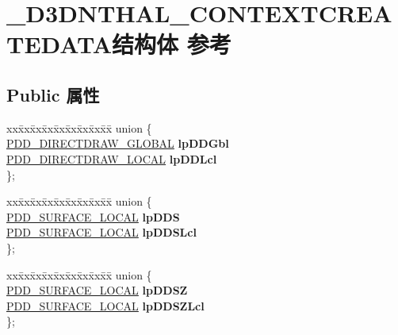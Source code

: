 \hypertarget{struct___d3_d_n_t_h_a_l___c_o_n_t_e_x_t_c_r_e_a_t_e_d_a_t_a}{}\section{\+\_\+\+D3\+D\+N\+T\+H\+A\+L\+\_\+\+C\+O\+N\+T\+E\+X\+T\+C\+R\+E\+A\+T\+E\+D\+A\+T\+A结构体 参考}
\label{struct___d3_d_n_t_h_a_l___c_o_n_t_e_x_t_c_r_e_a_t_e_d_a_t_a}
\subsection*{Public 属性}
\begin{DoxyCompactItemize}
\item 
\mbox{\label{struct___d3_d_n_t_h_a_l___c_o_n_t_e_x_t_c_r_e_a_t_e_d_a_t_a_a6dc1b26adcb0a44710f58fdb2e7abc67}} 
\begin{tabbing}
xx\=xx\=xx\=xx\=xx\=xx\=xx\=xx\=xx\=\kill
union \{\\
\>\hyperlink{struct___d_d___d_i_r_e_c_t_d_r_a_w___g_l_o_b_a_l}{PDD\_DIRECTDRAW\_GLOBAL} {\bfseries lpDDGbl}\\
\>\hyperlink{struct___d_d___d_i_r_e_c_t_d_r_a_w___l_o_c_a_l}{PDD\_DIRECTDRAW\_LOCAL} {\bfseries lpDDLcl}\\
\}; \\

\end{tabbing}\item 
\mbox{\label{struct___d3_d_n_t_h_a_l___c_o_n_t_e_x_t_c_r_e_a_t_e_d_a_t_a_a7850d4902f928a2c36e392a6adc17f0b}} 
\begin{tabbing}
xx\=xx\=xx\=xx\=xx\=xx\=xx\=xx\=xx\=\kill
union \{\\
\>\hyperlink{struct___d_d___s_u_r_f_a_c_e___l_o_c_a_l}{PDD\_SURFACE\_LOCAL} {\bfseries lpDDS}\\
\>\hyperlink{struct___d_d___s_u_r_f_a_c_e___l_o_c_a_l}{PDD\_SURFACE\_LOCAL} {\bfseries lpDDSLcl}\\
\}; \\

\end{tabbing}\item 
\mbox{\label{struct___d3_d_n_t_h_a_l___c_o_n_t_e_x_t_c_r_e_a_t_e_d_a_t_a_a5fa50819362849e4113c367d2cdac603}} 
\begin{tabbing}
xx\=xx\=xx\=xx\=xx\=xx\=xx\=xx\=xx\=\kill
union \{\\
\>\hyperlink{struct___d_d___s_u_r_f_a_c_e___l_o_c_a_l}{PDD\_SURFACE\_LOCAL} {\bfseries lpDDSZ}\\
\>\hyperlink{struct___d_d___s_u_r_f_a_c_e___l_o_c_a_l}{PDD\_SURFACE\_LOCAL} {\bfseries lpDDSZLcl}\\
\}; \\


\end{tabbing}
\end{DoxyCompactItemize}
